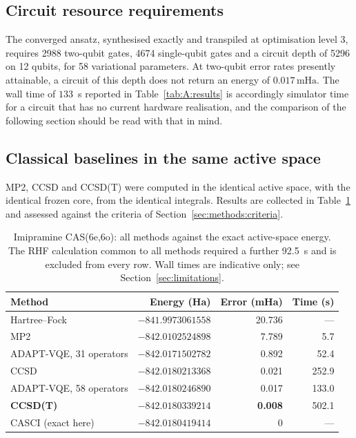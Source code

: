 \documentclass[11pt,a4paper]{article}
\newcommand{\mHa}{\ensuremath{\,\mathrm{mHa}}}
\begin{document}
\subsection{Circuit resource requirements}

The converged ansatz, synthesised exactly and transpiled at optimisation level
3, requires 2988 two-qubit gates, 4674 single-qubit gates and a circuit depth
of 5296 on 12 qubits, for 58 variational parameters. At two-qubit error rates
presently attainable, a circuit of this depth does not return an energy of
$0.017\mHa$. The wall time of $133$~s reported in
Table~\ref{tab:A:results} is accordingly simulator time for a circuit that has
no current hardware realisation, and the comparison of the following section
should be read with that in mind.

\subsection{Classical baselines in the same active space}
\label{sec:A:classical}

MP2, CCSD and CCSD(T) were computed in the identical active space, with the
identical frozen core, from the identical integrals. Results are collected in
Table~\ref{tab:A:classical} and assessed against the criteria of
Section~\ref{sec:methods:criteria}.

\begin{table}[htbp]
\centering
\small
\caption{Imipramine CAS(6e,6o): all methods against the exact active-space
energy. The RHF calculation common to all methods required a further 92.5~s and
is excluded from every row. Wall times are indicative only; see
Section~\ref{sec:limitations}.}
\label{tab:A:classical}
\begin{tabular}{@{}lrrr@{}}
\toprule
Method & Energy (Ha) & Error (mHa) & Time (s) \\
\midrule
Hartree--Fock            & $-841.9973061558$ & 20.736 & --- \\
MP2                      & $-842.0102524898$ &  7.789 &   5.7 \\
ADAPT-VQE, 31 operators  & $-842.0171502782$ &  0.892 &  52.4 \\
CCSD                     & $-842.0180213368$ &  0.021 & 252.9 \\
ADAPT-VQE, 58 operators  & $-842.0180246890$ &  0.017 & 133.0 \\
\textbf{CCSD(T)}         & $-842.0180339214$ & \textbf{0.008} & 502.1 \\
CASCI (exact here)       & $-842.0180419414$ &  0     & --- \\
\bottomrule
\end{tabular}
\end{table}
\end{document}
